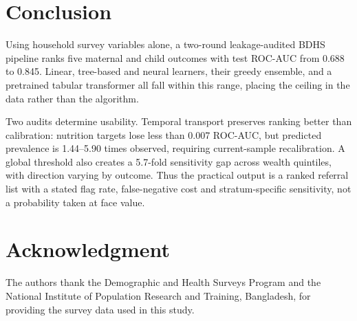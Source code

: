 \documentclass[conference]{IEEEtran}
\begin{document}
\section{Conclusion}

Using household survey variables alone, a two-round leakage-audited BDHS
pipeline ranks five maternal and child outcomes with test ROC-AUC from 0.688
to 0.845. Linear, tree-based and neural learners, their greedy ensemble, and a
pretrained tabular transformer all fall within this range, placing the ceiling
in the data rather than the algorithm.

Two audits determine usability. Temporal transport preserves ranking better
than calibration: nutrition targets lose less than 0.007 ROC-AUC, but predicted
prevalence is 1.44--5.90 times observed, requiring current-sample
recalibration. A global threshold also creates a 5.7-fold sensitivity gap
across wealth quintiles, with direction varying by outcome. Thus the practical
output is a ranked referral list with a stated flag rate, false-negative cost
and stratum-specific sensitivity, not a probability taken at face value.

\section*{Acknowledgment}
The authors thank the Demographic and Health Surveys Program and the National
Institute of Population Research and Training, Bangladesh, for providing the
survey data used in this study.
\end{document}
